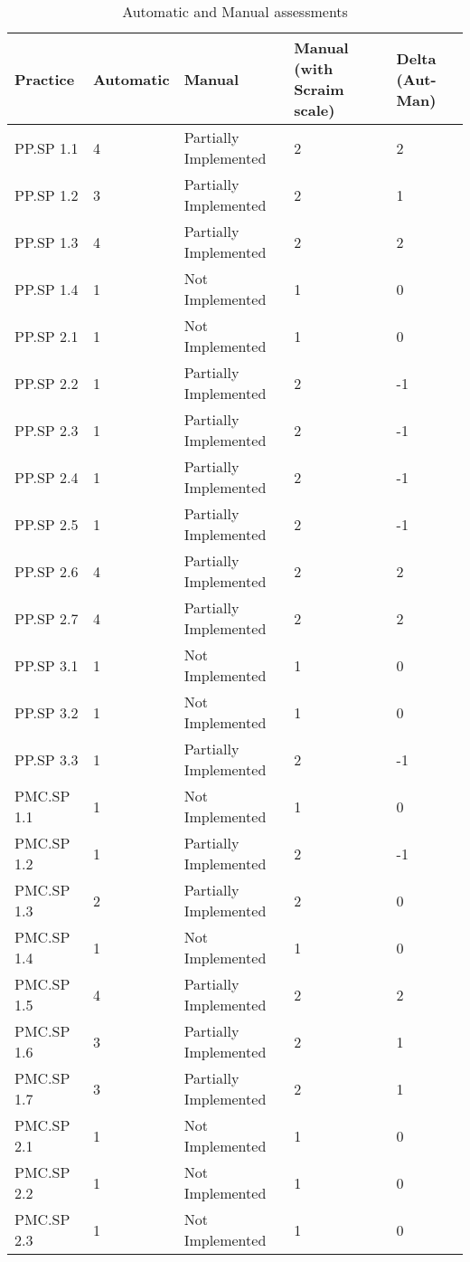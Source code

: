\begin{table}[H]
	\centering
	\caption{Automatic and Manual assessments}
	\begin{tabular}{lllll}
		\hline
		Practice  & Automatic & Manual & Manual (with Scraim scale)& Delta (Aut-Man)\\
		\hline
		PP.SP 1.1 & 4 & Partially Implemented & 2 & 2\\
		PP.SP 1.2 & 3 & Partially Implemented & 2 & 1 \\
		PP.SP 1.3 & 4 & Partially Implemented & 2 & 2 \\
		PP.SP 1.4 & 1 & Not Implemented & 1 & 0 \\
		PP.SP 2.1 & 1 & Not Implemented & 1 & 0\\
		PP.SP 2.2 & 1 & Partially Implemented & 2 & -1 \\
		PP.SP 2.3 & 1 & Partially Implemented & 2 & -1 \\
		PP.SP 2.4 & 1 & Partially Implemented & 2 & -1 \\
		PP.SP 2.5 & 1 & Partially Implemented & 2 & -1 \\
		PP.SP 2.6 & 4 & Partially Implemented & 2 & 2 \\
		PP.SP 2.7 & 4 & Partially Implemented & 2 & 2 \\
		PP.SP 3.1 & 1 & Not Implemented & 1 & 0\\
		PP.SP 3.2 & 1 & Not Implemented & 1 & 0\\
		PP.SP 3.3 & 1 & Partially Implemented & 2 & -1\\
		PMC.SP 1.1 & 1 & Not Implemented & 1 & 0\\
		PMC.SP 1.2 & 1 & Partially Implemented  & 2 & -1\\
		PMC.SP 1.3 & 2 & Partially Implemented  & 2 & 0\\
		PMC.SP 1.4 & 1 & Not Implemented & 1 & 0\\
		PMC.SP 1.5 & 4 & Partially Implemented  & 2 & 2\\
		PMC.SP 1.6 & 3 & Partially Implemented  & 2 & 1\\
		PMC.SP 1.7 & 3 & Partially Implemented  & 2 & 1\\
		PMC.SP 2.1 & 1 & Not Implemented  & 1 & 0 \\
		PMC.SP 2.2 & 1 & Not Implemented   & 1 & 0 \\
		PMC.SP 2.3 & 1 & Not Implemented  & 1 & 0\\
		\hline
	\end{tabular}
	\label{tab:automaticmanual}
\end{table}

